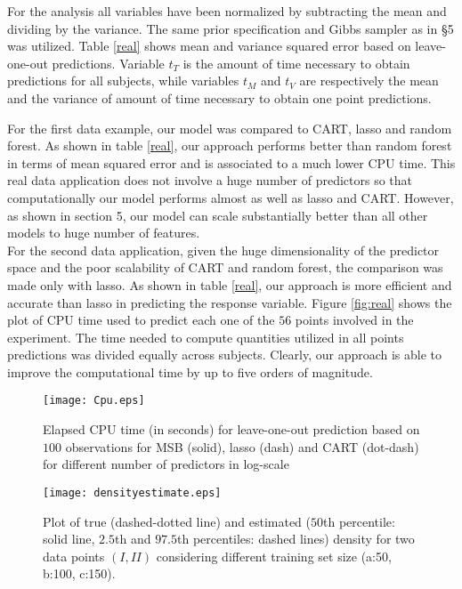 \documentclass{article}
\begin{document}
For the analysis all variables have been normalized by subtracting the mean and dividing by the variance. The same prior specification and Gibbs sampler as in \S 5 was  utilized. Table \ref{real} shows mean and variance squared error based on leave-one-out predictions. Variable $t_{T}$ is the amount of time necessary to obtain predictions for all subjects, while variables $t_M$ and $t_V$ are respectively the mean and the variance of amount of time necessary to obtain one point predictions.

 For the first data example, our model was compared to CART, lasso and random forest. As shown in table \ref{real}, our approach performs better than random forest in terms of mean squared error and is associated to a much lower CPU time. This real data application does not involve a huge number of predictors so that computationally our model performs almost as well as lasso and CART. However, as  shown in section 5, our model can scale substantially better than all other models to huge number of features. \\
 
 For the second data application, given the huge dimensionality of the predictor space and the poor scalability of CART and random forest, the comparison was made only with lasso. As shown in table \ref{real}, our approach is more efficient and accurate than lasso in predicting the response variable. Figure \ref{fig:real} shows the plot of CPU time used to predict each one of the $56$ points involved in the experiment. The time needed to compute quantities utilized in all points predictions was divided equally across subjects. Clearly, our approach is able to improve the computational time by up to five orders of magnitude.


\newpage



\begin{figure}
\centering
\texttt{[image: Cpu.eps]}
\caption{Elapsed CPU time (in seconds) for leave-one-out prediction based on $100$ observations for MSB (solid), lasso (dash) and CART (dot-dash) for different number of predictors in log-scale} \label{Cpu}
\end{figure}

\begin{figure}
\centering
\texttt{[image: densityestimate.eps]}
\caption{Plot of true (dashed-dotted line) and estimated ($50$th percentile: solid line, $2.5$th and $97.5$th percentiles: dashed lines) density for two data points $(I, II)$ considering different training set size (a:50, b:100, c:150). } \label{plotDensity}
\end{figure}
\end{document}
